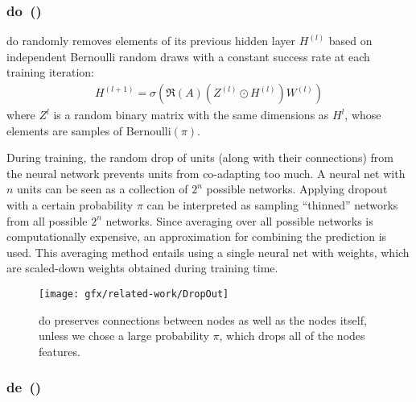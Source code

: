 \subsubsection{\acl*{do}~(\citeauthor{Srivastava2014})}
\label{sec:related:pred:regularization:do}

\ac{do}\cite{Srivastava2014} randomly removes elements of its previous hidden
layer $H^{(l)}$ based on independent Bernoulli random draws with a constant success rate at each
training iteration:
\begin{align*}
    H^{(l+1)} = \sigma(\mathfrak{R}(A)(Z^{(l)}\odot H^{(l)}) W^{(l)})
\end{align*}
where $Z^{l}$ is a random binary matrix with the same dimensions as $H^{l}$, whose elements are samples of Bernoulli$(\pi)$.

During training, the random drop of units (along with their connections) from the neural network prevents units from co-adapting too much.
A neural net with $n$ units can be seen as a collection of $2^{n}$ possible networks.
Applying dropout with a certain probability $\pi$ can be interpreted as sampling ``thinned'' networks from all possible $2^{n}$ networks.
Since averaging over all possible networks is computationally expensive, an approximation for combining the prediction is used.
This averaging method entails using a single neural net with weights, which are scaled-down weights obtained during
training time.

\begin{figure}[ht]
    \centering
    \texttt{[image: gfx/related-work/DropOut]}
    \caption{\acf{do} preserves connections between nodes as well as the
        nodes itself, unless we chose a large probability $\pi$, which drops all of the nodes
        features.}\label{fig:related:DropOut}
\end{figure}
\subsubsection{\acl*{de}~(\citeauthor{Rong2020})}
\label{sec:related:pred:regularization:de}


